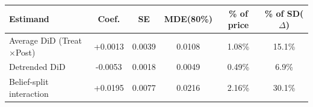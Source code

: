 \begin{tabular}{lccccc}
\toprule
Estimand & Coef. & SE & MDE(80\%) & \% of price & \% of SD($\Delta$) \\
\midrule
Average DiD (Treat$\times$Post) & +0.0013 & 0.0039 & 0.0108 & 1.08\% & 15.1\% \\
Detrended DiD & -0.0053 & 0.0018 & 0.0049 & 0.49\% & 6.9\% \\
Belief-split interaction & +0.0195 & 0.0077 & 0.0216 & 2.16\% & 30.1\% \\
\bottomrule
\end{tabular}
